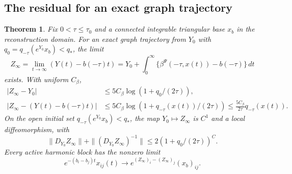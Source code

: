\documentclass[11pt]{amsart}
\newtheorem{theorem}{Theorem}[section]
\theoremstyle{definition}
\theoremstyle{remark}
\begin{document}
\subsection{The residual for an exact graph trajectory}
\begin{theorem}\label{thm:residual}
Fix $0<\tau\le\tau_0$ and a connected integrable triangular
base $x_b$ in the reconstruction domain.
For an exact graph trajectory from $Y_0$ with
$q_0=q_{-\tau}(e^{Y_0}x_b)<q_*$, the limit
\begin{equation}\label{eq:residual-integral}
 Z_\infty=\lim_{t\to\infty}(Y(t)-b(-\tau)t)
 =Y_0+\int_0^\infty
          \{\beta^\Psi(-\tau,x(t))-b(-\tau)\}\,dt
\end{equation}
exists. With uniform $C_\beta$,
\begin{equation}\label{eq:residual-bounds}
 \begin{aligned}
 |Z_\infty-Y_0|&\le5C_\beta\log(1+q_0/(2\tau)),\\
 |Z_\infty-(Y(t)-b(-\tau)t)|
       &\le5C_\beta\log(1+q_{-\tau}(x(t))/(2\tau))
        \le\frac{5C_\beta}{2\tau}q_{-\tau}(x(t)).
 \end{aligned}
\end{equation}
On the open initial set $q_{-\tau}(e^{Y_0}x_b)<q_*$,
the map $Y_0\mapsto Z_\infty$ is $C^1$ and a local
diffeomorphism, with
\begin{equation}\label{eq:residual-derivatives}
 \|D_{Y_0}Z_\infty\|+
 \|(D_{Y_0}Z_\infty)^{-1}\|
       \le2(1+q_0/(2\tau))^C .
\end{equation}
Every active harmonic block has the nonzero limit
\begin{equation}\label{eq:rescaled-blocks}
 e^{-(b_i-b_j)t}x_{ij}(t)
       \longrightarrow
 e^{(Z_\infty)_i-(Z_\infty)_j}(x_b)_{ij}.
\end{equation}
\end{theorem}
\end{document}
